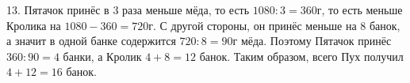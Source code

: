 13. Пятачок принёс в 3 раза меньше мёда, то есть $1080:3=360$г, то есть меньше Кролика на $1080-360=720$г. С другой стороны, он принёс меньше на 8 банок, а значит в одной банке содержится $720:8=90$г мёда. Поэтому Пятачок принёс $360:90=4$ банки, а Кролик $4+8=12$ банок. Таким образом, всего Пух получил $4+12=16$ банок.\\
